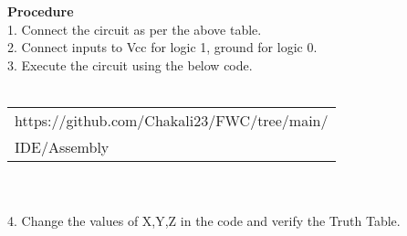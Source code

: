 \documentclass[journal,12pt,twocolumn]{IEEEtran}
\begin{document}
\textbf{Procedure}\\
1. Connect the circuit as per the above table.\\
2. Connect inputs to Vcc for logic 1, ground for logic 0.\\
3. Execute the circuit using the below code.\\
\\\begin{tabularx}{0.45\textwidth} { 
  | >{\centering\arraybackslash}X |
 }
  \hline
https://github.com/Chakali23/FWC/tree/main/\\IDE/Assembly\\
  \hline
\end{tabularx}\\
\\4. Change the values of X,Y,Z in the code and verify the Truth Table.\\
\end{document}
